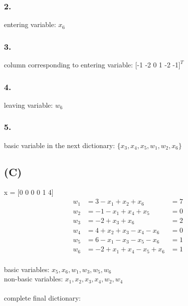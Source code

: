 \documentclass[12pt]{article}
\begin{document}
\subsubsection*{2.}
entering variable: $x_6$

\subsubsection*{3.}
column corresponding to entering variable: $[$-1 -2 0 1 -2 -1$]^T$

\subsubsection*{4.}
leaving variable: $w_6$

\subsubsection*{5.}
basic variable in the next dictionary: $\{x_3, x_4, x_5, w_1, w_2, x_6\}$

\newpage
\subsection*{(C)}
x = $[$0 0 0 0 1 4$]$
\begin{align*}
    w_1 &= 3 - x_1 + x_2 + x_6 &= 7 \\
    w_2 &= -1 - x_1 + x_4 + x_5 &= 0 \\
    w_3 &= -2 + x_3 + x_6 &= 2 \\
    w_4 &= 4 + x_2 + x_3 - x_4 - x_6 &= 0 \\
    w_5 &= 6 - x_1 - x_3 - x_5 - x_6 &= 1 \\
    w_6 &= -2 + x_1 + x_4 - x_5 + x_6 &= 1
\end{align*}
\\
basic variables: $x_5, x_6, w_1, w_3, w_5, w_6$ \\
non-basic variables: $x_1, x_2, x_3, x_4, w_2, w_4$ \\
\\
complete final dictionary: \\
\end{document}
